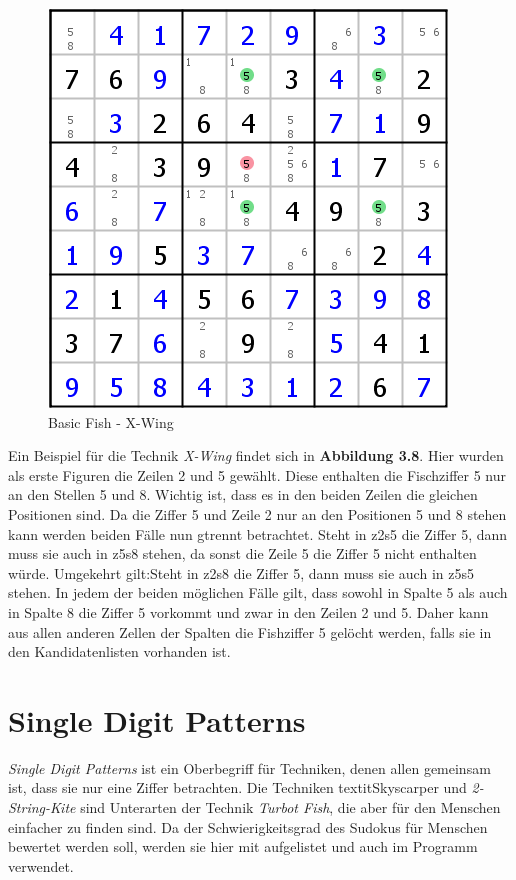 \documentclass[accentcolor=tud6b,11pt,paper=a4]{tudreport}
\begin{document}
\begin{figure}[h]
\begin{center}
\includegraphics{./img/x_wing.png}
\caption{Basic Fish - X-Wing}
\end{center}
\end{figure}

Ein Beispiel für die Technik \textit{X-Wing} findet sich in \textbf{Abbildung 3.8}. Hier wurden als erste Figuren die Zeilen 2 und 5 gewählt. Diese enthalten die Fischziffer 5 nur an den Stellen 5 und 8. Wichtig ist, dass es in den beiden Zeilen die gleichen Positionen sind. Da die Ziffer 5 und Zeile 2 nur an den Positionen 5 und 8 stehen kann werden beiden Fälle nun gtrennt betrachtet. Steht in z2s5 die Ziffer 5, dann muss sie auch in z5s8 stehen, da sonst die Zeile 5 die Ziffer 5 nicht enthalten würde. Umgekehrt gilt:Steht in z2s8 die Ziffer 5, dann muss sie auch in z5s5 stehen. In jedem der beiden möglichen Fälle gilt, dass sowohl in Spalte 5 als auch in Spalte 8 die Ziffer 5 vorkommt und zwar in den Zeilen 2 und 5. Daher kann aus allen anderen Zellen der Spalten die Fishziffer 5 gelöcht werden, falls sie in den Kandidatenlisten vorhanden ist.

\newpage
\section{Single Digit Patterns}
\textit{Single Digit Patterns} ist ein Oberbegriff für Techniken, denen allen gemeinsam ist, dass sie nur eine Ziffer betrachten. Die Techniken textit{Skyscarper} und \textit{2-String-Kite} sind Unterarten der Technik \textit{Turbot Fish}, die aber für den Menschen einfacher zu finden sind. Da der Schwierigkeitsgrad des Sudokus für Menschen bewertet werden soll, werden sie hier mit aufgelistet und auch im Programm verwendet.
\end{document}
